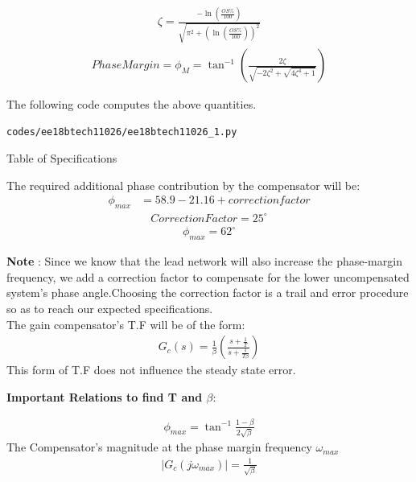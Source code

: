 \begin{enumerate}[label=\thesubsection.\arabic*.,ref=\thesubsection.\theenumi]
\begin{align}
    \zeta = \frac{-\ln\left(\frac{OS\%}{100}\right)}{\sqrt{\pi^2+\left(\ln\left(\frac{OS\%}{100}\right)\right)^2}}
\end{align}
\begin{align}
    Phase Margin = \phi_{M} = \tan^{-1}\left(\frac{2\zeta}{\sqrt{-2\zeta^2 + \sqrt{4\zeta^4 + 1}}}\right)  
\end{align}

The following code computes the above quantities.
\begin{lstlisting}
codes/ee18btech11026/ee18btech11026_1.py
\end{lstlisting}


\begin{table}[!ht]
\centering

\caption{Table of Specifications}
\label{table:ee18btech11026_table_1}
\end{table}
The required additional phase contribution by the compensator will be:
\begin{align}
     \phi_{max} & = 58.9 - 21.16 + correction factor
\end{align}
\begin{align}
     Correction Factor = 25^{\circ}
\end{align}
\begin{align}
    \phi_{max} = 62^{\circ}
\end{align}

\textbf{Note} : Since we know that the lead network will also increase the phase-margin frequency, we add a correction factor to compensate for the lower uncompensated system’s phase angle.Choosing the correction factor is a trail and error procedure so as to reach our expected specifications.\\
The gain compensator's T.F will be of the form:
\begin{align}
    G_{c}(s) = \frac{1}{\beta}\left(\frac{s+\frac{1}{T}}{s+\frac{1}{T\beta}}\right)
\end{align}
This form of T.F does not influence the steady state error.

\textbf{Important Relations to find T and $\beta$}:

\begin{align}
   \phi_{max} = \tan^{-1}\frac{1-\beta}{2\sqrt{\beta}}
\end{align}
The Compensator's magnitude at the phase margin frequency $\omega_{max}$
\begin{align}
     |G_{c}(j\omega_{max})| = \frac{1}{\sqrt{\beta}} 
\end{align}


\end{enumerate}
